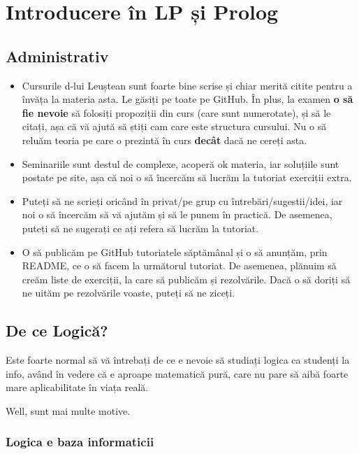 \chapter{ Introducere în LP și Prolog}

\section{Administrativ}

\begin{itemize}
	\item Cursurile d-lui Leuștean sunt foarte bine scrise și chiar merită citite pentru a învăța la materia asta. Le găsiți pe toate pe
	      GitHub. În plus, la examen \textbf{o să fie nevoie} să folosiți propoziții din curs (care sunt numerotate), și să le citați, așa că vă ajută să știți cam care este structura cursului. Nu o să reluăm teoria pe care o prezintă în curs \textbf{decât} dacă ne cereți asta.

	\item Seminariile sunt destul de complexe, acoperă ok materia, iar soluțiile sunt postate pe site, așa că noi o să încercăm să lucrăm la tutoriat exerciții extra.

	\item Puteți să ne scrieți oricând în privat/pe
	      grup cu întrebări/sugestii/idei, iar noi o să încercăm să vă ajutăm și să le punem în practică. De asemenea, puteți să ne sugerați ce ați
	      refera să lucrăm la tutoriat.

	\item O să publicăm pe GitHub tutoriatele săptămânal și o să anunțăm, prin README, ce o să facem la următorul tutoriat. De asemenea, plănuim să creăm liste de exerciții, la care să publicăm și rezolvările. Dacă o să doriți să ne uităm pe rezolvările voaste, puteți să ne ziceți.
\end{itemize}

\section{De ce Logică?}

Este foarte normal să vă întrebați de ce e nevoie să studiați logica ca studenți la info, având în vedere că e aproape matematică
pură, care nu pare să aibă foarte mare aplicabilitate în viața reală.


\noindent Well, sunt mai multe motive.

\subsection*{Logica e baza informaticii}

